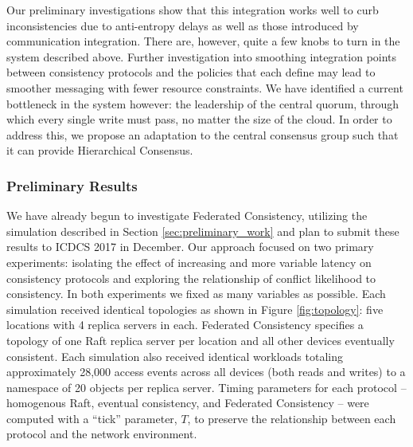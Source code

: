 \documentclass{article}
\begin{document}
Our preliminary investigations show that this integration works well to curb inconsistencies due to anti-entropy delays as well as those introduced by communication integration. There are, however, quite a few knobs to turn in the system described above. Further investigation into smoothing integration points between consistency protocols and the policies that each define may lead to smoother messaging with fewer resource constraints. We have identified a current bottleneck in the system however: the leadership of the central quorum, through which every single write must pass, no matter the size of the cloud. In order to address this, we propose an adaptation to the central consensus group such that it can provide Hierarchical Consensus.

\subsubsection{Preliminary Results}
\label{sec:federated_results}

We have already begun to investigate Federated Consistency, utilizing the simulation described in Section \ref{sec:preliminary_work} and plan to submit these results to ICDCS 2017 in December. Our approach focused on two primary experiments: isolating the effect of increasing and more variable latency on consistency protocols and exploring the relationship of conflict likelihood to consistency. In both experiments we fixed as many variables as possible. Each simulation received identical topologies as shown in Figure \ref{fig:topology}: five locations with 4 replica servers in each. Federated Consistency specifies a topology of one Raft replica server per location and all other devices eventually consistent. Each simulation also received identical workloads totaling approximately 28,000 access events across all devices (both reads and writes) to a namespace of 20 objects per replica server. Timing parameters for each protocol -- homogenous Raft, eventual consistency, and Federated Consistency -- were computed with a ``tick'' parameter, $T$, to preserve the relationship between each protocol and the network environment.
\end{document}
